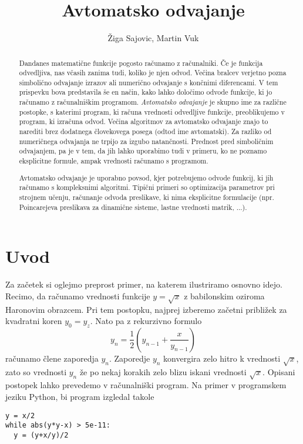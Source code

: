 \documentclass{article}
\title{Avtomatsko odvajanje}
\author{Žiga Sajovic, Martin Vuk}
\begin{document}
\maketitle
\begin{abstract}
  Dandanes matematične funkcije pogosto računamo z računalniki. Če je funkcija
  odvedljiva, nas včasih zanima tudi, koliko je njen odvod. Večina bralcev verjetno
  pozna simbolično odvajanje izrazov ali numerično odvajanje s končnimi
  diferencami. V tem prispevku bova predstavila še en način, kako lahko določimo
  odvode funkcije, ki jo računamo z računalniškim programom. \emph{Avtomatsko
    odvajanje} je skupno ime za različne postopke, s katerimi program, ki računa
  vrednosti odvedljive funkcije, preoblikujemo v program, ki izračuna odvod. 
  Večina algoritmov za avtomatsko odvajanje znajo to narediti brez dodatnega
  človekovega posega (odtod ime avtomatski). Za razliko
  od numeričnega odvajanja ne trpijo za izgubo natančnosti. Prednost pred
  simboličnim odvajanjem, pa je v tem, da jih lahko uporabimo tudi v primeru, ko
  ne poznamo eksplicitne formule, ampak vrednosti računamo s programom.

  Avtomatsko odvajanje je uporabno povsod, kjer potrebujemo 
  odvode funkcij, ki jih računamo s kompleksnimi algoritmi. Tipični primeri so
  optimizacija parametrov pri strojnem učenju, računanje odvoda preslikave, ki nima
  eksplicitne formulacije (npr. Poincarejeva preslikava za dinamične sisteme,
  lastne vrednosti matrik, ...).
\end{abstract}
\section{Uvod}
Za začetek si oglejmo preprost primer, na katerem ilustriramo osnovno idejo.
Recimo, da računamo vrednosti funkcije $y=\sqrt{x}$ z babilonskim oziroma Haronovim obrazcem.
Pri tem postopku, najprej izberemo začetni približek za
kvadratni koren $y_0=y_z$. Nato pa z rekurzivno formulo
\begin{equation*}
  y_n=\frac{1}{2}\left( y_{n-1}+\frac{x}{y_{n-1}} \right)
\end{equation*}
računamo člene zaporedja $y_n$. Zaporedje $y_n$ konvergira zelo hitro k
vrednosti $\sqrt{x}$, zato so vrednosti $y_n$ že po nekaj korakih zelo blizu
iskani vrednosti $\sqrt{x}$. Opisani postopek lahko prevedemo v računalniški
program. Na primer v programskem jeziku Python, bi program izgledal takole 

\begin{verbatim}
y = x/2
while abs(y*y-x) > 5e-11:
  y = (y+x/y)/2
\end{verbatim}
\end{document}
